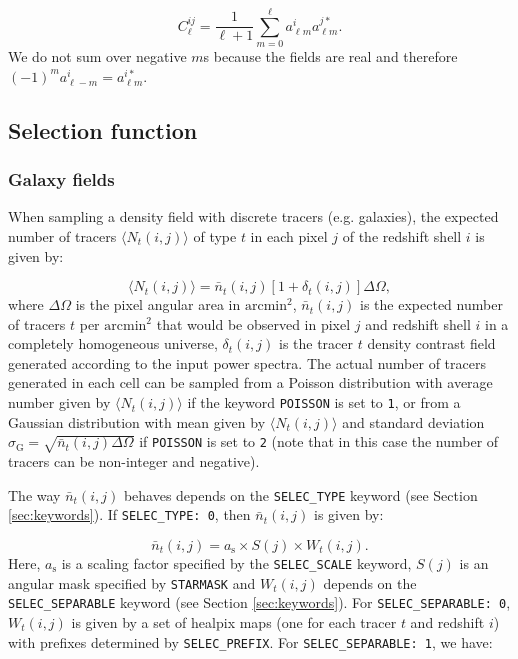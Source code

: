 \documentclass[12pt]{book} %
\begin{document}
\begin{equation}
C_\ell^{ij} = \frac{1}{\ell+1}\sum_{m=0}^\ell a_{\ell m}^{i}a_{\ell m}^{j*}.
\label{eq:recov-cl}
\end{equation}
We do not sum over negative $m$s because the fields are real and therefore 
$(-1)^m a_{\ell -m}^{i} = a_{\ell m}^{i*}$.

\subsection{Selection function}
\label{sec:selection}

\subsubsection{Galaxy fields}

When sampling a density field with discrete tracers (e.g. galaxies), the expected number 
of tracers $\langle N_t(i,j) \rangle$ of type $t$ in each pixel $j$ of the redshift shell $i$ 
is given by:

\begin{equation}
\langle N_t(i,j) \rangle = \bar{n}_t(i,j)[1+\delta_t(i,j)]\Delta\Omega,
\label{eq:tracer-number}
\end{equation}
where $\Delta\Omega$ is the pixel angular area in $\mathrm{arcmin}^2$, $\bar{n}_t(i,j)$ 
is the expected number of tracers $t$ per $\mathrm{arcmin}^2$ that would be observed 
in pixel $j$ and redshift shell $i$ in a completely homogeneous universe, 
$\delta_t(i,j)$ is the tracer $t$ density contrast field generated according 
to the input power spectra. The actual number of tracers generated in each cell can be sampled 
from a Poisson distribution with average number given by $\langle N_t(i,j) \rangle$ if the keyword 
{\tt POISSON} is set to {\tt 1}, or from a Gaussian distribution with mean given by 
$\langle N_t(i,j) \rangle$ and standard deviation $\sigma_{\mathrm{G}} = \sqrt{\bar{n}_t(i,j)\Delta\Omega}$ 
if {\tt POISSON} is set to {\tt 2} (note that in this case the number of tracers can be non-integer and 
negative).

The way $\bar{n}_t(i,j)$ behaves depends on the {\tt SELEC\_TYPE} keyword (see Section \ref{sec:keywords}). 
If {\tt SELEC\_TYPE: 0}, then $\bar{n}_t(i,j)$ is given by:

\begin{equation}
\bar{n}_t(i,j) = a_{\mathrm{s}} \times S(j) \times W_t(i,j).  
\label{eq:selection-function} 
\end{equation}
Here, $a_{\mathrm{s}}$ is a scaling factor specified by the {\tt SELEC\_SCALE} keyword, 
$S(j)$ is an angular mask specified by {\tt STARMASK} and $W_t(i,j)$ depends on the 
{\tt SELEC\_SEPARABLE} keyword (see Section \ref{sec:keywords}). For 
{\tt SELEC\_SEPARABLE: 0}, $W_t(i,j)$ is given by a set of {\sc healpix} maps (one for 
each tracer $t$ and redshift $i$) with prefixes determined by {\tt SELEC\_PREFIX}. For 
{\tt SELEC\_SEPARABLE: 1}, we have:
\end{document}
